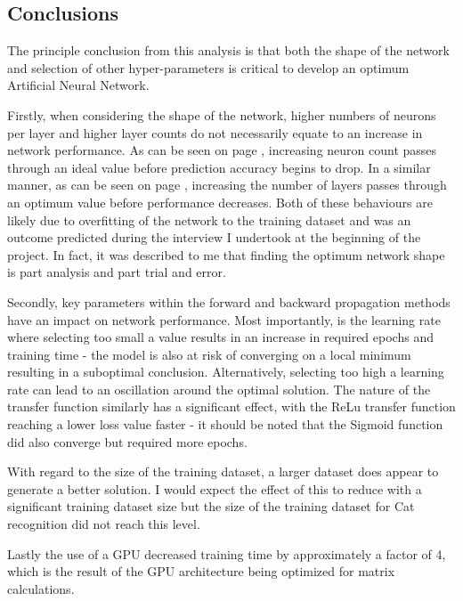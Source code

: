 \documentclass[./project-report/src/latex/project-report.tex]{subfiles}
\begin{document}
\label{sec:cpu-vs-gpu-analysis}



\subsection{Conclusions}

The principle conclusion from this analysis is that both the shape of the network and selection of other hyper-parameters is critical to develop an optimum Artificial Neural 
Network. 

Firstly, when considering the shape of the network, higher numbers of neurons per layer and higher layer counts do not necessarily equate to an increase in network 
performance. As can be seen on page \pageref{sec:neuron-count-analysis}, increasing neuron count passes through an ideal value before prediction accuracy begins to drop. In a 
similar manner, as can be seen on page \pageref{sec:layer-count-analysis}, increasing the number of layers passes through an optimum value before performance decreases. Both 
of these behaviours are likely due to overfitting of the network to the training dataset and was an outcome predicted during the interview I undertook at the beginning of the 
project. In fact, it was described to me that finding the optimum network shape is part analysis and part trial and error.

Secondly, key parameters within the forward and backward propagation methods have an impact on network performance. Most importantly, is the learning rate where selecting too 
small a value results in an increase in required epochs and training time - the model is also at risk of converging on a local minimum resulting in a suboptimal conclusion. 
Alternatively, selecting too high a learning rate can lead to an oscillation around the optimal solution. The nature of the transfer function similarly has a significant 
effect, with the ReLu transfer function reaching a lower loss value faster - it should be noted that the Sigmoid function did also converge but required more epochs.

With regard to the size of the training dataset, a larger dataset does appear to generate a better solution. I would expect the effect of this to reduce with a significant 
training dataset size but the size of the training dataset for Cat recognition did not reach this level.

Lastly the use of a GPU decreased training time by approximately a factor of 4, which is the result of the GPU architecture being optimized for matrix calculations.

\pagebreak
\end{document}
